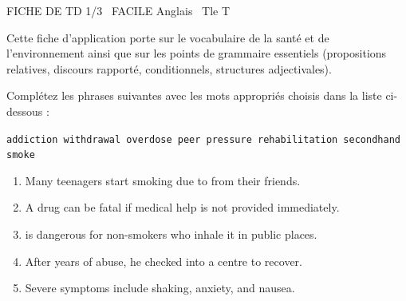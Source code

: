 \documentclass[11pt]{article}
\begin{document}
\begin{tcolorbox}[enhanced,colback=popink,colframe=popink,arc=10pt,boxrule=0pt,left=12pt,right=12pt,top=9pt,bottom=9pt]
{\color{white}\popxbold\small FICHE DE TD 1/3 \textbullet\ FACILE \hfill Anglais \textbullet\ Tle T\par}
\end{tcolorbox}
\vspace{4pt}
Cette fiche d'application porte sur le vocabulaire de la santé et de l'environnement ainsi que sur les points de grammaire essentiels (propositions relatives, discours rapporté, conditionnels, structures adjectivales).

\begin{exercice}
Complétez les phrases suivantes avec les mots appropriés choisis dans la liste ci-dessous :
\begin{center}
\texttt{addiction \quad withdrawal \quad overdose \quad peer pressure \quad rehabilitation \quad secondhand smoke}
\end{center}
\begin{enumerate}
    \item Many teenagers start smoking due to \underline{\hspace{4cm}} from their friends.
    \item A drug \underline{\hspace{4cm}} can be fatal if medical help is not provided immediately.
    \item \underline{\hspace{4cm}} is dangerous for non-smokers who inhale it in public places.
    \item After years of abuse, he checked into a \underline{\hspace{4cm}} centre to recover.
    \item Severe \underline{\hspace{4cm}} symptoms include shaking, anxiety, and nausea.
\end{enumerate}
\end{exercice}
\end{document}
